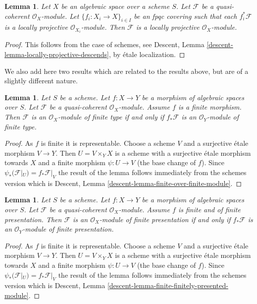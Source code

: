 \documentclass{stacks-project}
\theoremstyle{plain}
\newtheorem{lemma}[subsection]{Lemma}
\theoremstyle{definition}
\theoremstyle{remark}
\numberwithin{equation}{subsection}
\begin{document}
\begin{lemma}
\label{lemma-locally-projective-descends}
Let $X$ be an algebraic space over a scheme $S$.
Let $\mathcal{F}$ be a quasi-coherent $\mathcal{O}_X$-module.
Let $\{f_i : X_i \to X\}_{i \in I}$ be an fpqc covering such that
each $f_i^*\mathcal{F}$ is a locally projective $\mathcal{O}_{X_i}$-module.
Then $\mathcal{F}$ is a locally projective $\mathcal{O}_X$-module.
\end{lemma}

\begin{proof}
This follows from the case of schemes, see
Descent, Lemma \ref{descent-lemma-locally-projective-descends},
by \'etale localization.
\end{proof}

\noindent
We also add here two results which are related to the results above, but
are of a slightly different nature.

\begin{lemma}
\label{lemma-finite-over-finite-module}
Let $S$ be a scheme.
Let $f : X \to Y$ be a morphism of algebraic spaces over $S$.
Let $\mathcal{F}$ be a quasi-coherent $\mathcal{O}_X$-module.
Assume $f$ is a finite morphism.
Then $\mathcal{F}$ is an $\mathcal{O}_X$-module of finite type
if and only if $f_*\mathcal{F}$ is an $\mathcal{O}_Y$-module of finite
type.
\end{lemma}

\begin{proof}
As $f$ is finite it is representable. Choose a scheme $V$ and a surjective
\'etale morphism $V \to Y$. Then $U = V \times_Y X$ is a scheme with
a surjective \'etale morphism towards $X$ and a finite morphism
$\psi : U \to V$ (the base change of $f$). Since
$\psi_*(\mathcal{F}|_U) = f_*\mathcal{F}|_V$
the result of the lemma follows immediately from the schemes version which
is
Descent, Lemma \ref{descent-lemma-finite-over-finite-module}.
\end{proof}

\begin{lemma}
\label{lemma-finite-finitely-presented-module}
Let $S$ be a scheme.
Let $f : X \to Y$ be a morphism of algebraic spaces over $S$.
Let $\mathcal{F}$ be a quasi-coherent $\mathcal{O}_X$-module.
Assume $f$ is finite and of finite presentation.
Then $\mathcal{F}$ is an $\mathcal{O}_X$-module of finite presentation
if and only if $f_*\mathcal{F}$ is an $\mathcal{O}_Y$-module of finite
presentation.
\end{lemma}

\begin{proof}
As $f$ is finite it is representable. Choose a scheme $V$ and a surjective
\'etale morphism $V \to Y$. Then $U = V \times_Y X$ is a scheme with
a surjective \'etale morphism towards $X$ and a finite morphism
$\psi : U \to V$ (the base change of $f$). Since
$\psi_*(\mathcal{F}|_U) = f_*\mathcal{F}|_V$
the result of the lemma follows immediately from the schemes version which
is
Descent, Lemma \ref{descent-lemma-finite-finitely-presented-module}.
\end{proof}
\end{document}
